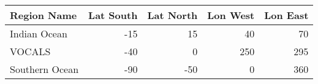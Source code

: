 \begin{tabular}{lrrrr}
  \hline
  Region Name              & Lat South & Lat North & Lon West & Lon East \\ \hline
  Indian Ocean             & -15 &  15 &  40 &  70 \\
  VOCALS                   & -40 &   0 & 250 & 295 \\
  Southern Ocean           & -90 & -50 &   0 & 360 \\ \hline
\end{tabular}
